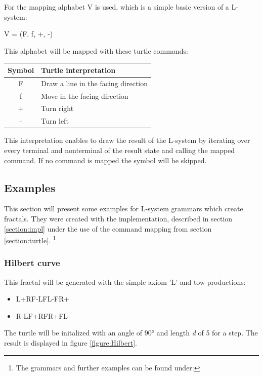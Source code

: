 \documentclass[english]{cpp-hmwk}
\begin{document}
\noindent For the mapping alphabet V is used, which is a simple basic version of a L-system:

\begin{center}
V = (F, f, +, -)
\end{center}

This alphabet will be mapped with these turtle commands:

\begin{center}
\begin{tabular}{ c l }
Symbol & Turtle interpretation \\
\hline
F & Draw a line in the facing direction  \\ 
f & Move in the facing direction  \\  
+& Turn right  \\  
-& Turn left  \\  

\end{tabular}
\end{center}

This interpretation enables to draw the result of the L-system by iterating over every terminal and nonterminal of the result state and calling the mapped command. If no command is mapped the symbol will be skipped.

\subsection{Examples}
This section will present some examples for L-system grammars which create fractals. They were created with the implementation, described in section \ref{section:impl} under the use of the command mapping from section \ref{section:turtle}. 
\footnote{The grammars and further examples can be found under: }
  
\subsubsection{Hilbert curve}
This fractal will be generated with the simple axiom 'L' and tow productions: 

\begin{itemize}
\item L\rightarrow +RF-LFL-FR+
\item R\rightarrow-LF+RFR+FL-
\end{itemize}


\noindent The turtle will be initalized with an angle of 90° and length \textit{d} of 5 for a step. The result is displayed in figure \ref{figure:Hilbert}.
\end{document}
